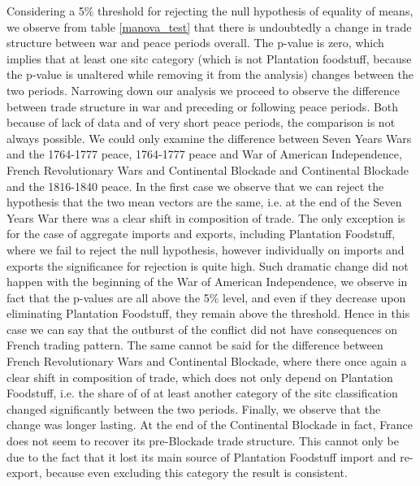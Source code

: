 \documentclass[12pt,a4paper,notitlepage,english]{article}
\begin{document}
Considering a 5\% threshold for rejecting the null hypothesis of equality of means, we observe from table \ref{manova_test} that there is undoubtedly a change in trade structure between war and peace periods overall. The p-value is zero, which implies that at least one sitc category (which is not Plantation foodstuff, because the p-value is unaltered while removing it from the analysis) changes between the two periods. Narrowing down our analysis we proceed to observe the difference between trade structure in war and preceding or following peace periods. Both because of lack of data and of very short peace periods, the comparison is not always possible. We could only examine the difference between Seven Years Wars and the 1764-1777 peace, 1764-1777 peace and War of American Independence, French Revolutionary Wars and Continental Blockade and Continental Blockade and the 1816-1840 peace. In the first case we observe that we can reject the hypothesis that the two mean vectors are the same, i.e. at the end of the Seven Years War there was a clear shift in composition of trade. The only exception is for the case of aggregate imports and exports, including Plantation Foodstuff, where we fail to reject the null hypothesis, however individually on imports and exports the significance for rejection is quite high. Such dramatic change did not happen with the beginning of the War of American Independence, we observe in fact that the p-values are all above the 5\% level, and even if they decrease upon eliminating Plantation Foodstuff, they remain above the threshold. Hence in this case we can say that the outburst of the conflict did not have consequences on French trading pattern. The same cannot be said for the difference between French Revolutionary Wars and Continental Blockade, where there once again a clear shift in composition of trade, which does not only depend on Plantation Foodstuff, i.e. the share of of at least another category of the sitc classification changed significantly between the two periods. Finally, we observe that the change was longer lasting. At the end of the Continental Blockade in fact, France does not seem to recover its pre-Blockade trade structure. This cannot only be due to the fact that it lost its main source of Plantation Foodstuff import and re-export, because even excluding this category the result is consistent. 
  

%
\end{document}
